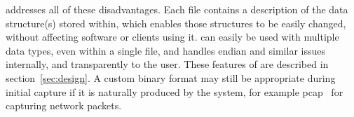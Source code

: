 \DataSeries{} addresses all of these disadvantages. Each \DataSeries{}
file contains a description of the data structure(s) stored within, which
enables those structures to be easily changed, without affecting \DataSeries{}
software or clients using it. \DataSeries{} can easily be used with multiple
data types, even within a single file, and handles endian and similar
issues internally, and transparently to the user. These features of
\DataSeries{} are described in section~\ref{sec:design}.
A custom binary format may still be appropriate during initial capture if it
is naturally produced by the system, for example pcap~\cite{libpcap}
for capturing network packets.




